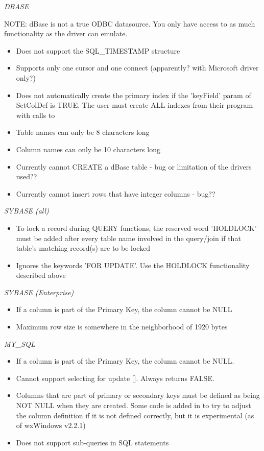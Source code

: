 {\it DBASE}

NOTE: dBase is not a true ODBC datasource.  You only have access to as much 
functionality as the driver can emulate.

\begin{itemize}\itemsep=0pt
\item Does not support the SQL_TIMESTAMP structure
\item Supports only one cursor and one connect (apparently? with Microsoft driver only?)
\item Does not automatically create the primary index if the 'keyField' param of SetColDef is TRUE.  The user must create ALL indexes from their program with calls to 
\item Table names can only be 8 characters long
\item Column names can only be 10 characters long
\item Currently cannot CREATE a dBase table - bug or limitation of the drivers used??
\item Currently cannot insert rows that have integer columns - bug??
\end{itemize}

{\it SYBASE (all)}
\begin{itemize}\itemsep=0pt
\item To lock a record during QUERY functions, the reserved word 'HOLDLOCK' must be added after every table name involved in the query/join if that table's matching record(s) are to be locked
\item Ignores the keywords 'FOR UPDATE'.  Use the HOLDLOCK functionality described above
\end{itemize}

{\it SYBASE (Enterprise)}
\begin{itemize}\itemsep=0pt
\item If a column is part of the Primary Key, the column cannot be NULL
\item Maximum row size is somewhere in the neighborhood of 1920 bytes
\end{itemize}

{\it MY_SQL}
\begin{itemize}\itemsep=0pt
\item If a column is part of the Primary Key, the column cannot be NULL.
\item Cannot support selecting for update [].  Always returns FALSE.
\item Columns that are part of primary or secondary keys must be defined as being NOT NULL when they are created.  Some code is added in  to try to adjust the column definition if it is not defined correctly, but it is experimental (as of wxWindows v2.2.1)
\item Does not support sub-queries in SQL statements
\end{itemize}

